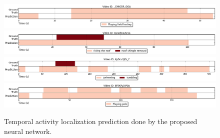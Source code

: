 \begin{figure}[H]
\begin{center}
\includegraphics[width=1\linewidth]{img/results/activity_detection/activity_temporal_localization_8}
\includegraphics[width=1\linewidth]{img/results/activity_detection/activity_temporal_localization_9}
\includegraphics[width=1\linewidth]{img/results/activity_detection/activity_temporal_localization_10}
\includegraphics[width=1\linewidth]{img/results/activity_detection/activity_temporal_localization_11}
\end{center}
\caption{Temporal activity localization prediction done by the proposed neural network.}
\label{fig:results_visualization_detection}
\end{figure}

